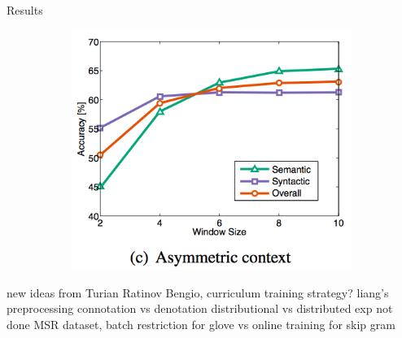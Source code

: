 \begin{frame}{Results}
\begin{figure}
\begin{subfigure}[b]{0.33\textwidth}
    \end{subfigure}%
    \begin{subfigure}[b]{0.33\textwidth}
      \includegraphics[width=\textwidth]{images/analogy3.png}
    \end{subfigure}%
  \end{figure}
\end{frame}


\begin{frame}
  new ideas from Turian Ratinov Bengio,
  curriculum training strategy?
  liang's preprocessing
  connotation vs denotation
  distributional vs distributed
  exp not done MSR dataset,
  batch restriction for glove vs online training for skip gram
\end{frame}
